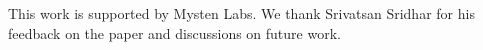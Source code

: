 This work is supported by Mysten Labs. We thank Srivatsan Sridhar for his feedback on the paper and discussions on future work.